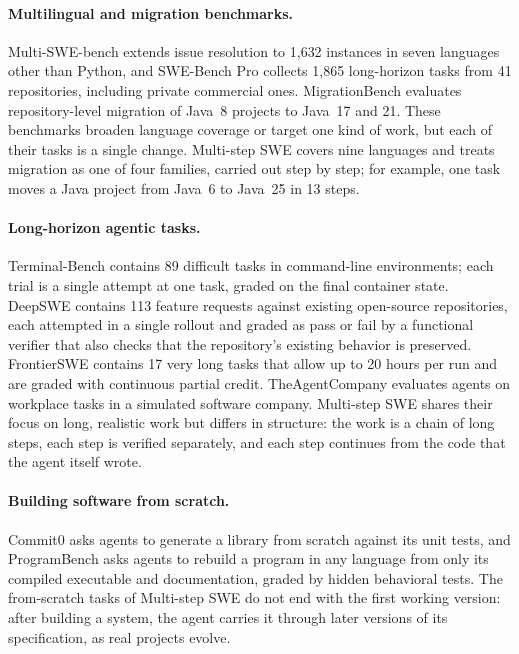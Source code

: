 \documentclass{article}
\newcommand{\bench}{Multi-step SWE\xspace}
\begin{document}
\paragraph{Multilingual and migration benchmarks.}
Multi-SWE-bench \citep{zan2025multiswebench} extends issue resolution to 1,632
instances in seven languages other than Python, and SWE-Bench Pro
\citep{deng2025swebenchpro} collects 1,865 long-horizon tasks from 41
repositories, including private commercial ones. MigrationBench
\citep{liu2025migrationbench} evaluates repository-level migration of Java~8
projects to Java~17 and 21. These benchmarks broaden language coverage or
target one kind of work, but each of their tasks is a single change. \bench
covers nine languages and treats migration as one of four families, carried out
step by step; for example, one task moves a Java project from Java~6 to
Java~25 in 13 steps.

\paragraph{Long-horizon agentic tasks.}
Terminal-Bench \citep{merrill2026terminalbench} contains 89 difficult tasks in
command-line environments; each trial is a single attempt at one task, graded
on the final container state. DeepSWE \citep{huang2026deepswe} contains 113
feature requests against existing open-source repositories, each attempted in
a single rollout and graded as pass or fail by a functional verifier that also
checks that the repository's existing behavior is preserved. FrontierSWE
\citep{chu2026frontierswe} contains 17 very long tasks that allow up to 20
hours per run and are graded with continuous partial credit. TheAgentCompany
\citep{xu2024theagentcompany} evaluates agents on workplace tasks in a
simulated software company. \bench shares their focus on long, realistic work
but differs in structure: the work is a chain of long steps, each step is
verified separately, and each step continues from the code that the agent
itself wrote.

\paragraph{Building software from scratch.}
Commit0 \citep{zhao2024commit0} asks agents to generate a library from scratch
against its unit tests, and ProgramBench \citep{yang2026programbench} asks
agents to rebuild a program in any language from only its compiled executable
and documentation, graded by hidden behavioral tests. The from-scratch tasks of
\bench do not end with the first working version: after building a system, the
agent carries it through later versions of its specification, as real projects
evolve.
\end{document}
